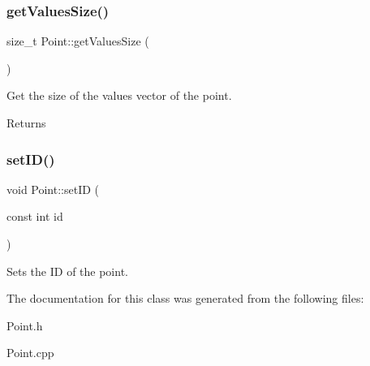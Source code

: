 \subsubsection{\texorpdfstring{get\+Values\+Size()}{getValuesSize()}}
{\footnotesize\ttfamily size\+\_\+t Point\+::get\+Values\+Size (\begin{DoxyParamCaption}{ }\end{DoxyParamCaption})}

Get the size of the values vector of the point. \begin{DoxyReturn}{Returns}

\end{DoxyReturn}
\mbox{\label{class_point_ae0c05a7c16aadbb5e9932e77b24ca921}} 
\subsubsection{\texorpdfstring{set\+I\+D()}{setID()}}
{\footnotesize\ttfamily void Point\+::set\+ID (\begin{DoxyParamCaption}\item[{const int}]{id }\end{DoxyParamCaption})}

Sets the ID of the point. 

The documentation for this class was generated from the following files\+:\begin{DoxyCompactItemize}
\item 
Point.\+h\item 
Point.\+cpp\end{DoxyCompactItemize}
